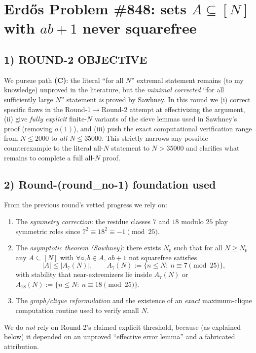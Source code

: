 \section{Erd\H{o}s Problem \#848: sets $A\subseteq[N]$ with $ab+1$ never squarefree}

\subsection*{1) ROUND-2 OBJECTIVE}
We pursue path \textbf{(C)}: the literal ``for all $N$'' extremal statement remains (to my knowledge) unproved in the literature, but the \emph{minimal corrected} ``for all sufficiently large $N$'' statement \emph{is} proved by Sawhney.
In this round we (i) correct specific flaws in the Round-1$\to$Round-2 attempt at effectivizing the argument, (ii) give \emph{fully explicit} finite-$N$ variants of the sieve lemmas used in Sawhney's proof (removing $o(1)$), and (iii) push the exact computational verification range from $N\le 2000$ to \emph{all $N\le 35000$}.
This strictly narrows any possible counterexample to the literal all-$N$ statement to $N>35000$ and clarifies what remains to complete a full all-$N$ proof.

\subsection*{2) Round-(round\_no-1) foundation used}
From the previous round's vetted progress we rely on:
\begin{enumerate}
\item The \emph{symmetry correction}: the residue classes $7$ and $18$ modulo $25$ play symmetric roles since $7^2\equiv 18^2\equiv -1\pmod{25}$.
\item The \emph{asymptotic theorem (Sawhney)}: there exists $N_0$ such that for all $N\ge N_0$ any $A\subseteq[N]$ with $\forall a,b\in A$, $ab+1$ not squarefree satisfies
\[
|A|\le |A_7(N)|,\qquad A_7(N):=\{n\le N:\ n\equiv 7\!\!\pmod{25}\},
\]
with stability that near-extremizers lie inside $A_7(N)$ or $A_{18}(N):=\{n\le N:\ n\equiv 18\!\!\pmod{25}\}$.
\item The \emph{graph/clique reformulation} and the existence of an \emph{exact} maximum-clique computation routine used to verify small $N$.
\end{enumerate}
We do \emph{not} rely on Round-2's claimed explicit threshold, because (as explained below) it depended on an unproved ``effective error lemma'' and a fabricated attribution.

